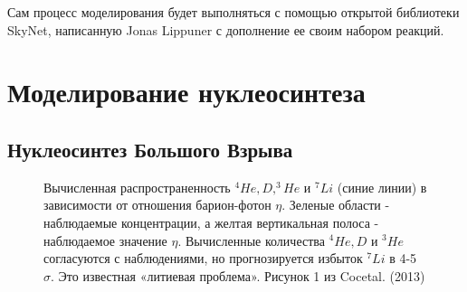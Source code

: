 \documentclass[%
master,    %
natbib,      %
subf,        %
href,        %
colorlinks,  %
]{disser}
\begin{document}
Сам процесс моделирования будет выполняться с помощью открытой библиотеки SkyNet, написанную Jonas Lippuner с дополнение ее своим набором реакций.

\section{Моделирование нуклеосинтеза}

\subsection{Нуклеосинтез Большого Взрыва}

\begin{figure}[h]
	\caption{Вычисленная распространенность $^4He, D, ^3He$ и $^7Li$ (синие линии) в зависимости от отношения барион-фотон $\eta$. Зеленые области - наблюдаемые концентрации, а желтая вертикальная полоса - наблюдаемое значение $\eta$. Вычисленные количества $^4He, D$ и $^3He$ согласуются с наблюдениями, но прогнозируется избыток $^7Li$ в 4-5 $\sigma$. Это известная «литиевая проблема». Рисунок 1 из Cocetal. (2013)}
	\label{ris:Cocetal}
\end{figure}
\end{document}
